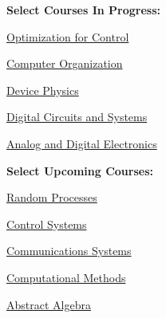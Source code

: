 \documentclass[10pt,a4paper,ragged2e,withhyper]{altacv}
\begin{document}
\begin{paracol}{2}
\begin{multicols}{2}
    \columnbreak
    
    \textbf{Select Courses In Progress:}
    \vspace{0.375cm}
    \begin{tightemize}
        \item \href{https://ece.umd.edu/course-schedule/course/ENEE469O}{Optimization for Control}
        \item \href{https://ece.umd.edu/course-schedule/course/ENEE350}{Computer Organization}
        \item \href{https://ece.umd.edu/course-schedule/course/ENEE313H}{Device Physics}
        \item \href{https://ece.umd.edu/course-schedule/course/ENEE245}{Digital Circuits and Systems}
        \item \href{https://ece.umd.edu/course-schedule/course/ENEE303}{Analog and Digital Electronics}
    \end{tightemize}
    
    \vspace{0.375cm}
    
    \textbf{Select Upcoming Courses:}
    \vspace{0.375cm}
    \begin{tightemize}
        \item \href{https://user.eng.umd.edu/~abarg/620/}{Random Processes}
        \item \href{https://ece.umd.edu/course-schedule/course/ENEE460}{Control Systems}
        \item \href{https://ece.umd.edu/course-schedule/course/ENEE420}{Communications Systems}
        \item \href{https://www-math.umd.edu/undergraduate/departmental-course-pages/offered-courses/420-amsc-460-computational-methods.html}{Computational Methods}
        \item \href{https://www-math.umd.edu/offered-courses/383-math-403-introduction-to-abstract-algebra.html}{Abstract Algebra}
    \end{tightemize}
\end{multicols}


    

\end{paracol}
\end{document}
